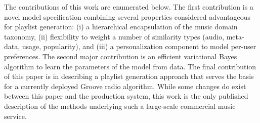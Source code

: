 
The contributions of this work are enumerated below. The first  contribution is a novel model specification combining several properties considered advantageous for playlist generation: (i) a hierarchical encapsulation of  the music domain taxonomy, (ii) flexibility to weight a number of similarity types (audio, meta-data, usage, popularity), and (iii) a personalization component to model per-user preferences. The second major contribution is an efficient  variational Bayes algorithm to learn the parameters of the model from data. 
The final contribution of this paper is in describing a playlist generation approach that serves the basis for a currently deployed Groove radio algorithm. While some changes do exist between this paper and the production system, this work is the only published description of the methods underlying such a large-scale commercial music service. %
 

